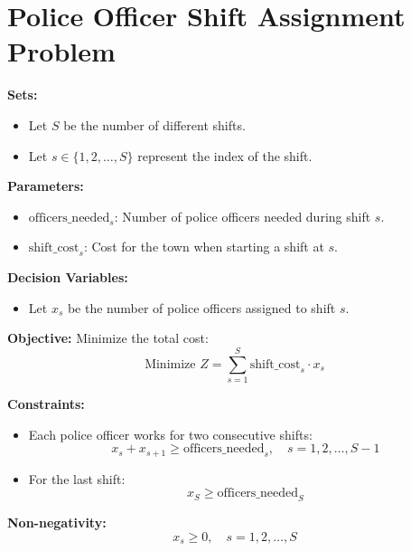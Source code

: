 \documentclass{article}
\begin{document}
\section*{Police Officer Shift Assignment Problem}

\textbf{Sets:}
\begin{itemize}
    \item Let \( S \) be the number of different shifts.
    \item Let \( s \in \{1, 2, \ldots, S\} \) represent the index of the shift.
\end{itemize}

\textbf{Parameters:}
\begin{itemize}
    \item \( \text{officers\_needed}_{s} \): Number of police officers needed during shift \( s \).
    \item \( \text{shift\_cost}_{s} \): Cost for the town when starting a shift at \( s \).
\end{itemize}

\textbf{Decision Variables:}
\begin{itemize}
    \item Let \( x_{s} \) be the number of police officers assigned to shift \( s \).
\end{itemize}

\textbf{Objective:}
Minimize the total cost:
\[
\text{Minimize } Z = \sum_{s=1}^{S} \text{shift\_cost}_{s} \cdot x_{s}
\]

\textbf{Constraints:}
\begin{itemize}
    \item Each police officer works for two consecutive shifts:
    \[
    x_{s} + x_{s+1} \geq \text{officers\_needed}_{s}, \quad s = 1, 2, \ldots, S-1
    \]
    \item For the last shift:
    \[
    x_{S} \geq \text{officers\_needed}_{S}
    \]
\end{itemize}

\textbf{Non-negativity:}
\[
x_{s} \geq 0, \quad s = 1, 2, \ldots, S
\]
\end{document}

